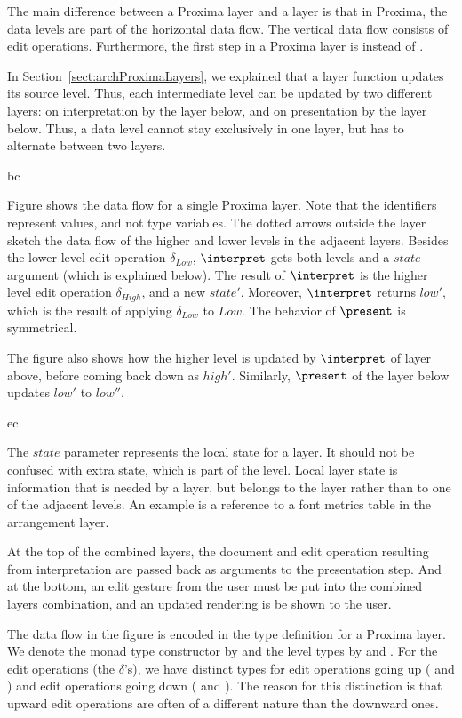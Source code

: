 \documentclass[preprint,natbib]{sigplanconf}
\begin{document}

The main difference between a Proxima layer and a  layer is that in Proxima, the data levels are part of the horizontal data flow. The vertical data flow consists of edit operations. Furthermore, the first step in a Proxima layer is  instead of .

In Section~\ref{sect:archProximaLayers}, we explained that a layer function updates its source level. Thus, each intermediate level can be updated by two different layers: on interpretation by the layer below, and on presentation by the layer below. Thus, a data level cannot stay exclusively in one layer, but has to alternate between two layers.

bc

Figure  shows the data flow for a single Proxima layer. Note that the identifiers represent values, and not type variables. The dotted arrows outside the layer sketch the data flow of the higher and lower levels in the adjacent layers. Besides the lower-level edit operation $\delta_{Low}$, $\interpret$ gets both levels and a $state$ argument (which is explained below). The result of $\interpret$ is the higher level edit operation $\delta_{High}$, and a new $state'$. Moreover, $\interpret$ returns $low'$, which is the result of applying $\delta_{Low}$ to $Low$. The behavior of $\present$ is symmetrical.

The figure also shows how the higher level is updated by $\interpret$ of layer above, before coming back down as $high'$. Similarly, $\present$ of the layer below updates $low'$ to $low''$. 

ec

The $state$ parameter represents the local state for a layer. It should not be confused with extra state, which is part of the level. Local layer state is information that is needed by a layer, but belongs to the layer rather than to one of the adjacent levels. An example is a reference to a font metrics table in the arrangement layer.

At the top of the combined layers, the document and edit operation resulting from interpretation are passed back as arguments to the presentation step. And at the bottom, an edit gesture from the user must be put into the combined layers combination, and an updated rendering is be shown to the user. 
 

The data flow in the figure is encoded in the type definition for a Proxima layer. We denote the monad type constructor by  and the level types by  and . For the edit operations (the $\delta$'s), we have distinct types for edit operations going up  ( and ) and edit operations going down ( and ). The reason for this distinction is that upward edit operations are often of a different nature than the downward ones.
\end{document}
